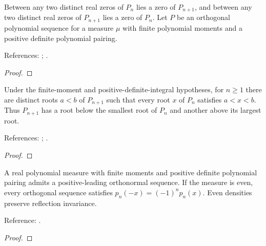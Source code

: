 \begin{theorem}
\label{thm:general-separation}
\leanok
Between any two distinct real zeros of $P_n$ lies a zero of $P_{n+1}$, and
between any two distinct real zeros of $P_{n+1}$ lies a zero of $P_n$.
Let $P$ be an orthogonal polynomial sequence for a measure $\mu$ with finite polynomial moments and a positive definite polynomial pairing.

References: \cite[18.2(vi)]{dlmf}; \cite[Chapter 3]{szego}.
\end{theorem}
\begin{proof}
\leanok
\end{proof}

\begin{theorem}
\label{thm:general-outer-roots}
\leanok
Under the finite-moment and positive-definite-integral hypotheses, for $n\ge1$
there are distinct roots $a<b$ of $P_{n+1}$ such that every root $x$ of $P_n$
satisfies $a<x<b$. Thus $P_{n+1}$ has a root below the smallest root of $P_n$
and another above its largest root.

References: \cite[Chapter 3]{szego}; \cite[18.2(vi)]{dlmf}.
\end{theorem}
\begin{proof}
\leanok
\end{proof}

\begin{theorem}
\label{thm:even-positive-sequences}
\leanok
A real polynomial measure with finite moments and positive definite polynomial
pairing admits a positive-leading orthonormal sequence. If the measure is even,
every orthogonal sequence satisfies $p_n(-x)=(-1)^n p_n(x)$.
Even densities preserve reflection invariance.

Reference: \cite[18.2(iii) and 18.2.21]{dlmf}.
\end{theorem}
\begin{proof}
\leanok
\end{proof}

